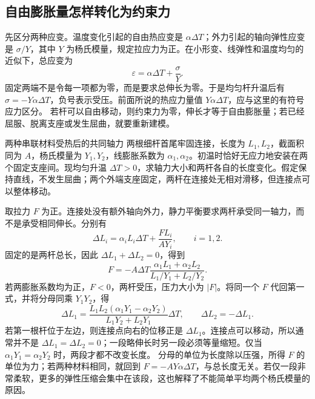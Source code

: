 \subsection{自由膨胀量怎样转化为约束力}
先区分两种应变。温度变化引起的自由热应变是 $\alpha\Delta T$；外力引起的轴向弹性应变是 $\sigma/Y$，其中 $Y$ 为杨氏模量，规定拉应力为正。在小形变、线弹性和温度均匀的近似下，总应变为
\[
 \varepsilon=\alpha\Delta T+\frac{\sigma}{Y}.
\]
固定两端不是令每一项都为零，而是要求总伸长为零。于是均匀杆升温后有 $\sigma=-Y\alpha\Delta T$，负号表示受压。前面所说的热应力量值 $Y\alpha\Delta T$，应与这里的有符号应力区分。
若杆可以自由移动，则约束力为零，伸长才等于自由膨胀量；若已经屈服、脱离支座或发生屈曲，就要重新建模。

\begin{origexamplebox}{两种串联材料受热后的共同轴力}\label{ch14:ex:teaching-composite}
两根细杆首尾牢固连接，长度为 $L_1,L_2$，截面积同为 $A$，杨氏模量为 $Y_1,Y_2$，线膨胀系数为 $\alpha_1,\alpha_2$。初温时恰好无应力地安装在两个固定支座间。现均匀升温 $\Delta T>0$，求轴力大小和两杆各自的长度变化。假定保持直线，不发生屈曲；两个外端支座固定，两杆在连接处无相对滑移，但连接点可以整体移动。
\end{origexamplebox}
\begin{xesolution}
取拉力 $F$ 为正。连接处没有额外轴向外力，静力平衡要求两杆承受同一轴力，而不是承受相同伸长。分别有
\[
 \Delta L_i=\alpha_iL_i\Delta T+\frac{FL_i}{AY_i},\qquad i=1,2.
\]
固定的是两杆总长，因此 $\Delta L_1+\Delta L_2=0$，得到
\[
 F=-A\Delta T\frac{\alpha_1L_1+\alpha_2L_2}{L_1/Y_1+L_2/Y_2}.
\]
若两膨胀系数均为正，$F<0$，两杆受压，压力大小为 $|F|$。将同一个 $F$ 代回第一式，并将分母同乘 $Y_1Y_2$，得
\[
 \Delta L_1=\frac{L_1L_2(\alpha_1Y_1-\alpha_2Y_2)}{L_1Y_2+L_2Y_1}\Delta T,
 \qquad \Delta L_2=-\Delta L_1.
\]
若第一根杆位于左边，则连接点向右的位移正是 $\Delta L_1$。连接点可以移动，所以通常并不是 $\Delta L_1=\Delta L_2=0$；一段略伸长时另一段必须等量缩短。仅当 $\alpha_1Y_1=\alpha_2Y_2$ 时，两段才都不改变长度。
分母的单位为长度除以压强，所得 $F$ 的单位为力；若两种材料相同，就回到 $F=-AY\alpha\Delta T$，与总长度无关。若仅一段非常柔软，更多的弹性压缩会集中在该段，这也解释了不能简单平均两个杨氏模量的原因。
\end{xesolution}
